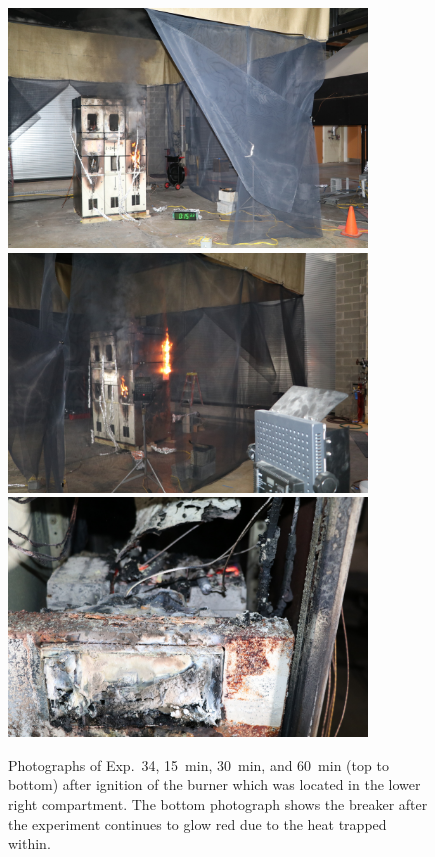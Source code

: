 \begin{figure}[p]
\centering
\includegraphics[height=2.50in]{../FIGURES/Test_34_15_min} \\ \vspace{0.1in}
\includegraphics[height=2.50in]{../FIGURES/Test_34_30_min} \\ \vspace{0.1in}
\includegraphics[height=2.50in]{../FIGURES/Test_34_60_min}
\caption[Photographs of Exp.~34]{Photographs of Exp.~34, 15~min, 30~min, and 60~min (top to bottom) after ignition of the burner which was located in the lower right compartment. The bottom photograph shows the breaker after the experiment continues to glow red due to the heat trapped within.}
\label{fig:Test_34_photos}
\end{figure}


